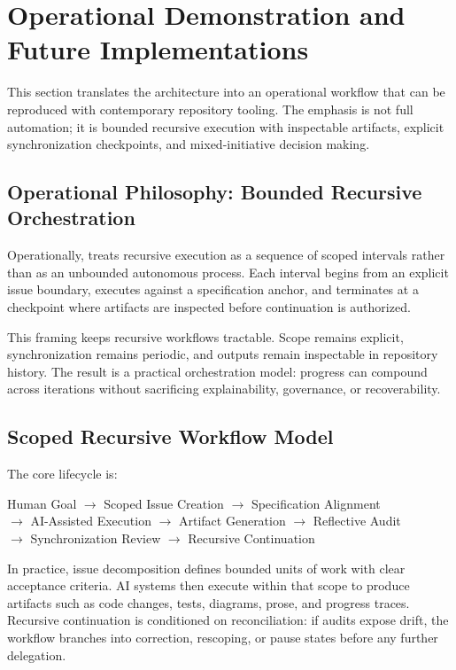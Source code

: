 \section{Operational Demonstration and Future Implementations}
\label{sec:operational-demonstration}

This section translates the  architecture into an operational workflow that can be reproduced with contemporary repository tooling. The emphasis is not full automation; it is bounded recursive execution with inspectable artifacts, explicit synchronization checkpoints, and mixed-initiative decision making.

\subsection{Operational Philosophy: Bounded Recursive Orchestration}

Operationally,  treats recursive execution as a sequence of scoped intervals rather than as an unbounded autonomous process. Each interval begins from an explicit issue boundary, executes against a specification anchor, and terminates at a checkpoint where artifacts are inspected before continuation is authorized.

This framing keeps recursive workflows tractable. Scope remains explicit, synchronization remains periodic, and outputs remain inspectable in repository history. The result is a practical orchestration model: progress can compound across iterations without sacrificing explainability, governance, or recoverability.

\subsection{Scoped Recursive Workflow Model}

The core lifecycle is:
\begin{center}
Human Goal $\rightarrow$ Scoped Issue Creation $\rightarrow$ Specification Alignment\\
$\rightarrow$ AI-Assisted Execution $\rightarrow$ Artifact Generation $\rightarrow$ Reflective Audit\\
$\rightarrow$ Synchronization Review $\rightarrow$ Recursive Continuation
\end{center}

In practice, issue decomposition defines bounded units of work with clear acceptance criteria. AI systems then execute within that scope to produce artifacts such as code changes, tests, diagrams, prose, and progress traces. Recursive continuation is conditioned on reconciliation: if audits expose drift, the workflow branches into correction, rescoping, or pause states before any further delegation.

